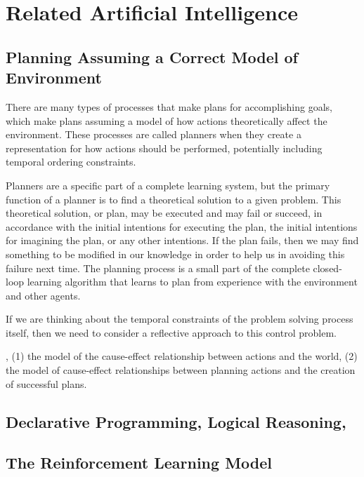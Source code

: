 \chapter{Related Artificial Intelligence}


\section{Planning Assuming a Correct Model of Environment}

There are many types of processes that make plans for accomplishing
goals, which make plans assuming a model of how actions theoretically
affect the environment.  These processes are called planners when they
create a representation for how actions should be performed,
potentially including temporal ordering constraints.

Planners are a specific part of a complete learning system, but the
primary function of a planner is to find a theoretical solution to a
given problem.  This theoretical solution, or plan, may be executed
and may fail or succeed, in accordance with the initial intentions for
executing the plan, the initial intentions for imagining the plan, or
any other intentions.  If the plan fails, then we may find something
to be modified in our knowledge in order to help us in avoiding this
failure next time.  The planning process is a small part of the
complete closed-loop learning algorithm that learns to plan from
experience with the environment and other agents.



If we are thinking about the temporal constraints of the problem
solving process itself, then we need to consider a reflective approach
to this control problem.

  , (1) the model of the cause-effect relationship
between actions and the world, (2) the model of cause-effect
relationships between planning actions and the creation of successful
plans.

\section{Declarative Programming, Logical Reasoning, }




\section{The Reinforcement Learning Model}

